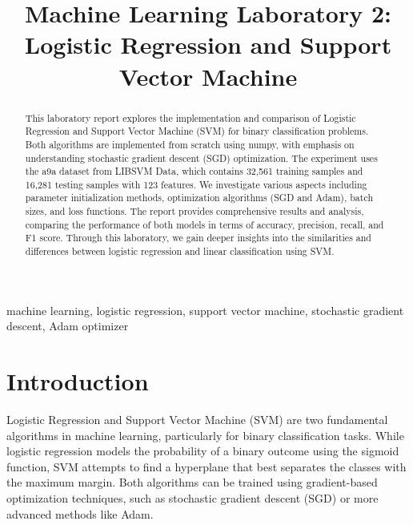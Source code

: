 \documentclass[journal, a4paper]{IEEEtran}
\begin{document}
\title{Machine Learning Laboratory 2: Logistic Regression and Support Vector Machine}

\author{
}

\maketitle

\begin{abstract}
This laboratory report explores the implementation and comparison of Logistic Regression and Support Vector Machine (SVM) for binary classification problems. Both algorithms are implemented from scratch using numpy, with emphasis on understanding stochastic gradient descent (SGD) optimization. The experiment uses the a9a dataset from LIBSVM Data, which contains 32,561 training samples and 16,281 testing samples with 123 features. We investigate various aspects including parameter initialization methods, optimization algorithms (SGD and Adam), batch sizes, and loss functions. The report provides comprehensive results and analysis, comparing the performance of both models in terms of accuracy, precision, recall, and F1 score. Through this laboratory, we gain deeper insights into the similarities and differences between logistic regression and linear classification using SVM.
\end{abstract}

\begin{IEEEkeywords}
machine learning, logistic regression, support vector machine, stochastic gradient descent, Adam optimizer
\end{IEEEkeywords}

\section{Introduction}
Logistic Regression and Support Vector Machine (SVM) are two fundamental algorithms in machine learning, particularly for binary classification tasks. While logistic regression models the probability of a binary outcome using the sigmoid function, SVM attempts to find a hyperplane that best separates the classes with the maximum margin. Both algorithms can be trained using gradient-based optimization techniques, such as stochastic gradient descent (SGD) or more advanced methods like Adam.
\end{document}
